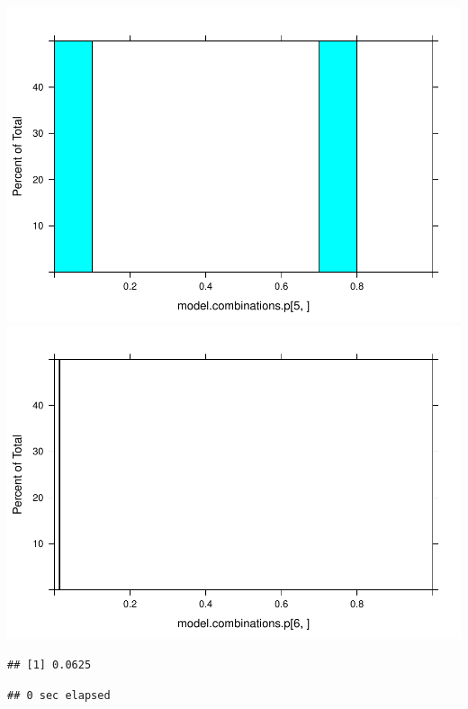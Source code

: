 \documentclass[man]{apa6}
\theoremstyle{definition}
\theoremstyle{definition}
\theoremstyle{definition}
\theoremstyle{remark}
\begin{document}
\includegraphics{stats_6_report_files/figure-latex/Model driven multiverse-1.pdf}
\includegraphics{stats_6_report_files/figure-latex/Model driven multiverse-2.pdf}

\begin{verbatim}
## [1] 0.0625
\end{verbatim}

\begin{verbatim}
## 0 sec elapsed
\end{verbatim}
\end{document}
